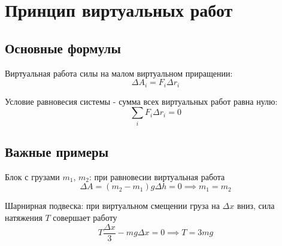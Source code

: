 \documentclass{article}
\begin{document}
\section*{Принцип виртуальных работ}

\subsection*{Основные формулы}

Виртуальная работа силы на малом виртуальном приращении:
\[
\Delta A_i = F_i\Delta r_i
\]

Условие равновесия системы - сумма всех виртуальных работ равна нулю:
\[
\sum_i F_i\Delta r_i = 0
\]

\subsection*{Важные примеры}

Блок с грузами $m_1$, $m_2$: при равновесии виртуальная работа
\[
\Delta A = (m_2 - m_1)g\Delta h = 0 \implies m_1 = m_2
\]

Шарнирная подвеска: при виртуальном смещении груза на $\Delta x$ вниз, сила натяжения $T$ совершает работу
\[
T\frac{\Delta x}{3} - mg\Delta x = 0 \implies T = 3mg
\]
\end{document}
